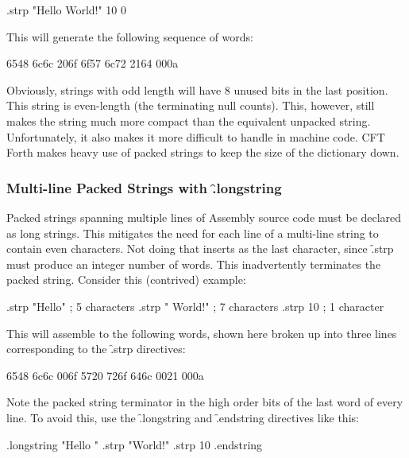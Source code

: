\begin{cftasmcode}
.strp "Hello World!" 10 0
\end{cftasmcode}

This will generate the following sequence of words:

\begin{intrcode}
6548 6c6c 206f 6f57 6c72 2164 000a
\end{intrcode}

Obviously, strings with odd length will have 8 unused bits in the last
position. This string is even-length (the terminating null counts). This,
however, still makes the string much more compact than the equivalent unpacked
string. Unfortunately, it also makes it more difficult to handle in machine
code. CFT Forth makes heavy use of packed strings to keep the size of the
dictionary down.



\subsubsection{Multi-line Packed Strings with \f{.longstring}}
\label{sec:asm-longstring}

Packed strings spanning multiple lines of Assembly source code must be
declared as long strings. This mitigates the need for each line of a
multi-line string to contain even characters. Not doing that inserts
 as the last character, since \f{.strp} must produce an integer
number of words. This inadvertently terminates the packed
string. Consider this (contrived) example:

\begin{cftasmcode}
.strp       "Hello"    ; 5 characters
.strp       " World!"  ; 7 characters
.strp       10         ; 1 character
\end{cftasmcode}

This will assemble to the following words, shown here broken up into
three lines corresponding to the \f{.strp} directives:

\begin{intrcode}
6548 6c6c 006f
5720 726f 646c 0021
000a
\end{intrcode}

Note the  packed string terminator in the high order bits of
the last word of every line. To avoid this, use the \f{.longstring}
and \f{.endstring} directives like this:

\begin{cftasmcode}
.longstring "Hello "
.strp       "World!"
.strp       10
.endstring
\end{cftasmcode}

